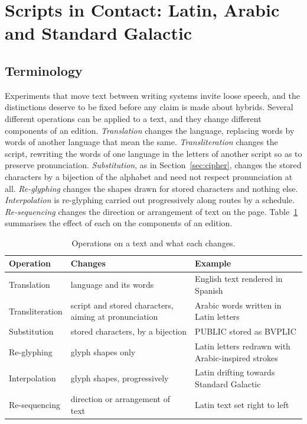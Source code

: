 \section{Scripts in Contact: Latin, Arabic and Standard Galactic}\label{sec:arabic}

\subsection{Terminology}

Experiments that move text between writing systems invite loose speech, and the distinctions deserve to be fixed before any claim is made about hybrids. Several different operations can be applied to a text, and they change different components of an edition. \emph{Translation} changes the language, replacing words by words of another language that mean the same. \emph{Transliteration} changes the script, rewriting the words of one language in the letters of another script so as to preserve pronunciation. \emph{Substitution}, as in Section~\ref{sec:cipher}, changes the stored characters by a bijection of the alphabet and need not respect pronunciation at all. \emph{Re-glyphing} changes the shapes drawn for stored characters and nothing else. \emph{Interpolation} is re-glyphing carried out progressively along routes by a schedule. \emph{Re-sequencing} changes the direction or arrangement of text on the page. Table~\ref{tab:ops} summarises the effect of each on the components of an edition.

\begin{table}[ht]
\centering
\small
\renewcommand{\arraystretch}{1.25}
\begin{tabular}{>{\raggedright\arraybackslash}p{2.6cm}>{\raggedright\arraybackslash}p{3.9cm}>{\raggedright\arraybackslash}p{4.4cm}}
\toprule
Operation & Changes & Example\\
\midrule
Translation & language and its words & English text rendered in Spanish\\
Transliteration & script and stored characters, aiming at pronunciation & Arabic words written in Latin letters\\
Substitution & stored characters, by a bijection & PUBLIC stored as BVPLIC\\
Re-glyphing & glyph shapes only & Latin letters redrawn with Arabic-inspired strokes\\
Interpolation & glyph shapes, progressively & Latin drifting towards Standard Galactic\\
Re-sequencing & direction or arrangement of text & Latin text set right to left\\
\bottomrule
\end{tabular}
\caption{Operations on a text and what each changes.}\label{tab:ops}
\end{table}

